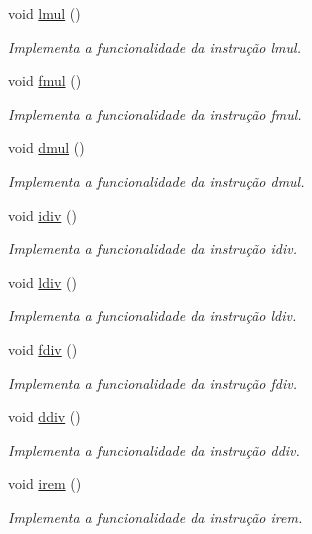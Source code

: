\begin{DoxyCompactItemize}
void \hyperlink{classOperations_ae23a8dfdcc02432b6f880334fa4a7c59}{lmul} ()
\begin{DoxyCompactList}\small\item\em Implementa a funcionalidade da instrução lmul. \end{DoxyCompactList}\item 
void \hyperlink{classOperations_ad4caf68c912edd7bfac5c8d74c1e2036}{fmul} ()
\begin{DoxyCompactList}\small\item\em Implementa a funcionalidade da instrução fmul. \end{DoxyCompactList}\item 
void \hyperlink{classOperations_afe1944066f35f66d588d1a28124ebb55}{dmul} ()
\begin{DoxyCompactList}\small\item\em Implementa a funcionalidade da instrução dmul. \end{DoxyCompactList}\item 
void \hyperlink{classOperations_a5bf24c3cc02a8282c21a37cd7b7ba5d3}{idiv} ()
\begin{DoxyCompactList}\small\item\em Implementa a funcionalidade da instrução idiv. \end{DoxyCompactList}\item 
void \hyperlink{classOperations_ab9bb90a9db0433e1d04b0eb9bceea9f4}{ldiv} ()
\begin{DoxyCompactList}\small\item\em Implementa a funcionalidade da instrução ldiv. \end{DoxyCompactList}\item 
void \hyperlink{classOperations_a85d79532189d640a6d02c99f204d2229}{fdiv} ()
\begin{DoxyCompactList}\small\item\em Implementa a funcionalidade da instrução fdiv. \end{DoxyCompactList}\item 
void \hyperlink{classOperations_a3c323c9f0d40e68bf54cd449a55618c3}{ddiv} ()
\begin{DoxyCompactList}\small\item\em Implementa a funcionalidade da instrução ddiv. \end{DoxyCompactList}\item 
void \hyperlink{classOperations_a510bd2d155695861597a4413b44565bc}{irem} ()
\begin{DoxyCompactList}\small\item\em Implementa a funcionalidade da instrução irem. \end{DoxyCompactList}\item 

\end{DoxyCompactItemize}
